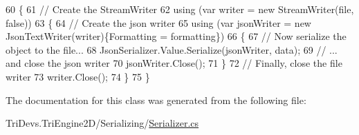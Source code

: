 \begin{DoxyCode}
60         \{
61             \textcolor{comment}{// Create the StreamWriter}
62             \textcolor{keyword}{using} (var writer = \textcolor{keyword}{new} StreamWriter(file, \textcolor{keyword}{false}))
63             \{
64                 \textcolor{comment}{// Create the json writer}
65                 \textcolor{keyword}{using} (var jsonWriter = \textcolor{keyword}{new} JsonTextWriter(writer)\{Formatting = formatting\})
66                 \{
67                     \textcolor{comment}{// Now serialize the object to the file...}
68                     JsonSerializer.Value.Serialize(jsonWriter, data);
69                     \textcolor{comment}{// ... and close the json writer}
70                     jsonWriter.Close();
71                 \}
72                 \textcolor{comment}{// Finally, close the file writer}
73                 writer.Close();
74             \}
75         \}
\end{DoxyCode}


The documentation for this class was generated from the following file\-:\begin{DoxyCompactItemize}
\item 
Tri\-Devs.\-Tri\-Engine2\-D/\-Serializing/\hyperlink{_serializer_8cs}{Serializer.\-cs}\end{DoxyCompactItemize}
